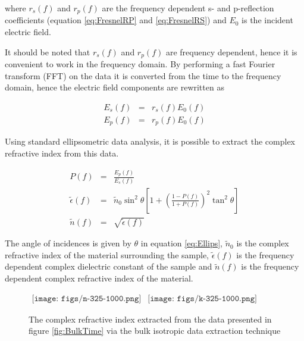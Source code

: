 where $r_{s}(f)$ and $r_{p}(f)$ are the frequency dependent s- and p-reflection coefficients (equation \ref{eq:FresnelRP} and \ref{eq:FresnelRS}) and $E_{0}$ is the incident electric field.

It should be noted that $r_{s}(f)$ and $r_{p}(f)$ are frequency dependent, hence it is convenient to work in the frequency domain. By performing a fast Fourier transform (FFT) on the data it is converted from the time to the frequency domain, hence the electric field components are rewritten as

\begin{eqnarray}
E_{s}(f) &=& r_{s}(f)E_{0}(f) \label{eq:Es-bulk Frequency}\\
E_{p}(f) &=& r_{p}(f)E_{0}(f) \label{eq:Ep-bulk Frequency}
\end{eqnarray}

Using standard ellipsometric data analysis, it is possible to extract the complex refractive index from this data.\cite{Tompkins-2005}

\begin{eqnarray}
P(f) &=& \frac{E_{p}(f)}{E_{s}(f)}\\
\widetilde{\epsilon}(f) &=& \widetilde{n}_{0}\sin^{2}{\theta}\left[1 + \left(\frac{1-P(f)}{1+P(f)}\right)^{2}\tan^{2}{\theta}\right]
\label{eq:Ellips}\\
\widetilde{n}(f) &=& \sqrt{\widetilde{\epsilon}(f)}
\end{eqnarray}

The angle of incidences is given by $\theta$ in equation \ref{eq:Ellips}, $\widetilde{n}_{0}$ is the complex refractive index of the material surrounding the sample, $\widetilde{\epsilon}(f)$ is the frequency dependent complex dielectric constant of the sample and $\widetilde{n}(f)$ is the frequency dependent complex refractive index of the material.

\begin{figure}[H]
                \begin{center}$
								\begin{array}{cc}
                \texttt{[image: figs/n-325-1000.png]}&
                \texttt{[image: figs/k-325-1000.png]}
								\end{array}$
								\end{center}
	\caption{The complex refractive index extracted from the data presented in figure \ref{fig:BulkTime} via the bulk isotropic data extraction technique}
	\label{fig:BulkExt}
\end{figure}

